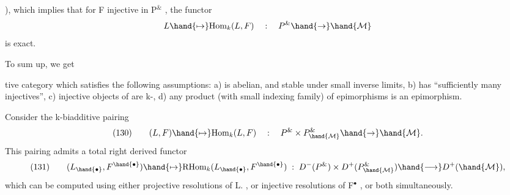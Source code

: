 
 ), which implies that for F  injective in P$^{\&}$ , the functor
\[ L \hand{\mapsto} \mathrm{Hom}_k(L,F) \quad : \quad P^{\&} \hand{\rightarrow} \hand{\mathcal{M}} \]
is exact.

\margin{$\times$} To sum up, we get  

\margin{\raisebox{-2cm}[0pt][0pt]{\rule{0.35pt}{2cm}}}
tive category which satisfies the following assumptions:
a)  is abelian, and stable under small inverse limits,
b)  has ``sufficiently many injectives'',
c) injective objects of  are k-,
d) any product (with small indexing family) of epimorphisms  is an
epimorphism.

Consider the k-biadditive pairing
\[ (130) \qquad (L,F) \hand{\mapsto} \mathrm{Hom}_k(L,F) \quad : \quad P^{\&} \times P^{\&}_{\hand{\mathcal{M}}} \hand{\rightarrow} \hand{\mathcal{M}}. \]
This pairing admits a total right derived functor
\[ (131) \qquad (L_{\hand{\bullet}},F^{\hand{\bullet}}) \hand{\mapsto} \mathrm{RHom}_k(L_{\hand{\bullet}},F^{\hand{\bullet}}) \; : \; D^{-}(P^{\&}) \times D^{+}(P^{\&}_{\hand{\mathcal{M}}}) \hand{\longrightarrow} D^{+}(\hand{\mathcal{M}}) , \] 
which can be computed using either projective resolutions of L. , or
injective resolutions of F$^{\bullet}$ , or both simultaneously.

